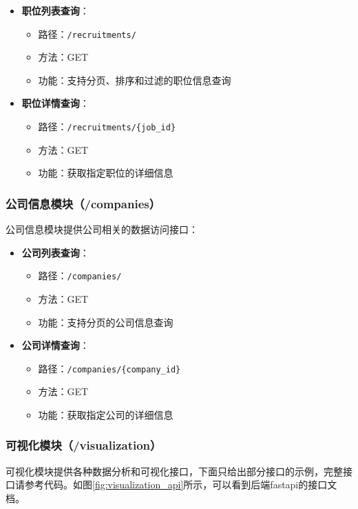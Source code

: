 \begin{itemize}
    \item \textbf{职位列表查询}：
    \begin{itemize}
        \item 路径：\texttt{/recruitments/}
        \item 方法：GET
        \item 功能：支持分页、排序和过滤的职位信息查询
    \end{itemize}
    
    \item \textbf{职位详情查询}：
    \begin{itemize}
        \item 路径：\texttt{/recruitments/\{job\_id\}}
        \item 方法：GET
        \item 功能：获取指定职位的详细信息
    \end{itemize}
\end{itemize}

\subsubsection{公司信息模块（/companies）}
公司信息模块提供公司相关的数据访问接口：

\begin{itemize}
    \item \textbf{公司列表查询}：
    \begin{itemize}
        \item 路径：\texttt{/companies/}
        \item 方法：GET
        \item 功能：支持分页的公司信息查询
    \end{itemize}
    
    \item \textbf{公司详情查询}：
    \begin{itemize}
        \item 路径：\texttt{/companies/\{company\_id\}}
        \item 方法：GET
        \item 功能：获取指定公司的详细信息
    \end{itemize}
\end{itemize}

\subsubsection{可视化模块（/visualization）}
可视化模块提供各种数据分析和可视化接口，下面只给出部分接口的示例，完整接口请参考代码。如图\ref{fig:visualization_api}所示，可以看到后端fastapi的接口文档。

